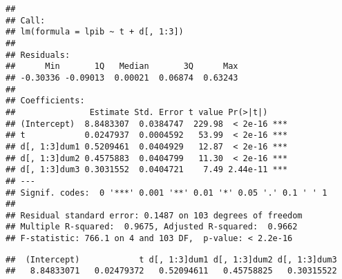 \documentclass[
]{article}
\newenvironment{Shaded}{\begin{snugshade}}{\end{snugshade}}
\newcommand{\NormalTok}[1]{#1}
\newcommand{\OtherTok}[1]{\textcolor[rgb]{0.56,0.35,0.01}{#1}}
\newcommand{\SpecialCharTok}[1]{\textcolor[rgb]{0.00,0.00,0.00}{#1}}
\begin{document}
\begin{verbatim}
## 
## Call:
## lm(formula = lpib ~ t + d[, 1:3])
## 
## Residuals:
##      Min       1Q   Median       3Q      Max 
## -0.30336 -0.09013  0.00021  0.06874  0.63243 
## 
## Coefficients:
##               Estimate Std. Error t value Pr(>|t|)    
## (Intercept)  8.8483307  0.0384747  229.98  < 2e-16 ***
## t            0.0247937  0.0004592   53.99  < 2e-16 ***
## d[, 1:3]dum1 0.5209461  0.0404929   12.87  < 2e-16 ***
## d[, 1:3]dum2 0.4575883  0.0404799   11.30  < 2e-16 ***
## d[, 1:3]dum3 0.3031552  0.0404721    7.49 2.44e-11 ***
## ---
## Signif. codes:  0 '***' 0.001 '**' 0.01 '*' 0.05 '.' 0.1 ' ' 1
## 
## Residual standard error: 0.1487 on 103 degrees of freedom
## Multiple R-squared:  0.9675, Adjusted R-squared:  0.9662 
## F-statistic: 766.1 on 4 and 103 DF,  p-value: < 2.2e-16
\end{verbatim}

\begin{Shaded}
\end{Shaded}

\begin{verbatim}
##  (Intercept)            t d[, 1:3]dum1 d[, 1:3]dum2 d[, 1:3]dum3 
##   8.84833071   0.02479372   0.52094611   0.45758825   0.30315522
\end{verbatim}
\end{document}
